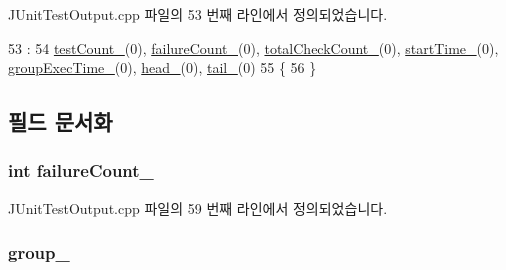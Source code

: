 J\+Unit\+Test\+Output.\+cpp 파일의 53 번째 라인에서 정의되었습니다.


\begin{DoxyCode}
53                            :
54         \hyperlink{struct_j_unit_test_group_result_ace881ee661bae3d8b8d63b6888f80a36}{testCount\_}(0), \hyperlink{struct_j_unit_test_group_result_a006a6550e4e3d4de173c35b50c1c90b0}{failureCount\_}(0), \hyperlink{struct_j_unit_test_group_result_ad899c291f0b26f32a1ea9b2e0768b53f}{totalCheckCount\_}(0), 
      \hyperlink{struct_j_unit_test_group_result_a70b6af34731f864392c859c7acc99488}{startTime\_}(0), \hyperlink{struct_j_unit_test_group_result_aa03782b81f9d9159d2e8ac6dc2d5d728}{groupExecTime\_}(0), \hyperlink{struct_j_unit_test_group_result_ad2d2ef5f012bfb8b2ae3c122935789ed}{head\_}(0), \hyperlink{struct_j_unit_test_group_result_a4d358acecdc5260d58b9d2fc96fe107a}{tail\_}(0)
55     \{
56     \}
\end{DoxyCode}


\subsection{필드 문서화}
\subsubsection[{\texorpdfstring{failure\+Count\+\_\+}{failureCount_}}]{\setlength{\rightskip}{0pt plus 5cm}int failure\+Count\+\_\+}\hypertarget{struct_j_unit_test_group_result_a006a6550e4e3d4de173c35b50c1c90b0}{}\label{struct_j_unit_test_group_result_a006a6550e4e3d4de173c35b50c1c90b0}


J\+Unit\+Test\+Output.\+cpp 파일의 59 번째 라인에서 정의되었습니다.

\subsubsection[{\texorpdfstring{group\+\_\+}{group_}}]{ group\+\_\+}\hypertarget{struct_j_unit_test_group_result_ad7a3f1d255163dcdda09624a69079758}{}\label{struct_j_unit_test_group_result_ad7a3f1d255163dcdda09624a69079758}


